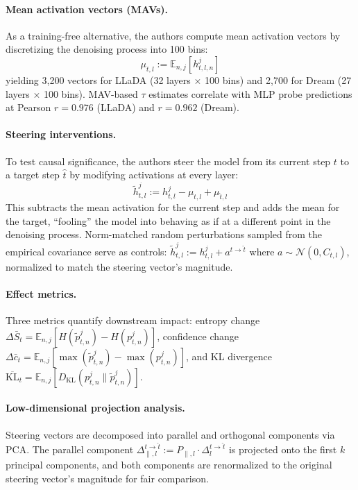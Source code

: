 \documentclass[11pt,a4paper]{article}
\begin{document}
\paragraph{Mean activation vectors (MAVs).}
As a training-free alternative, the authors compute mean activation vectors by discretizing the denoising process into 100 bins:
\begin{equation}
    \mu_{t,l} := \mathbb{E}_{n,j}[h_{t,l,n}^j]
\end{equation}
yielding 3,200 vectors for LLaDA (32 layers $\times$ 100 bins) and 2,700 for Dream (27 layers $\times$ 100 bins). MAV-based $\tau$ estimates correlate with MLP probe predictions at Pearson $r = 0.976$ (LLaDA) and $r = 0.962$ (Dream).

\paragraph{Steering interventions.}
To test causal significance, the authors steer the model from its current step $t$ to a target step $\hat{t}$ by modifying activations at every layer:
\begin{equation}
    \tilde{h}_{t,l}^j := h_{t,l}^j - \mu_{t,l} + \mu_{\hat{t},l}
\end{equation}
This subtracts the mean activation for the current step and adds the mean for the target, ``fooling'' the model into behaving as if at a different point in the denoising process. Norm-matched random perturbations sampled from the empirical covariance serve as controls: $\tilde{h}_{t,l}^j := h_{t,l}^j + a^{t \to \hat{t}}$ where $a \sim \mathcal{N}(0, C_{t,l})$, normalized to match the steering vector's magnitude.

\paragraph{Effect metrics.}
Three metrics quantify downstream impact: entropy change $\Delta\bar{S}_t = \mathbb{E}_{n,j}[H(\tilde{p}_{t,n}^j) - H(p_{t,n}^j)]$, confidence change $\Delta\bar{c}_t = \mathbb{E}_{n,j}[\max(\tilde{p}_{t,n}^j) - \max(p_{t,n}^j)]$, and KL divergence $\overline{\text{KL}}_t = \mathbb{E}_{n,j}[D_{\text{KL}}(p_{t,n}^j \| \tilde{p}_{t,n}^j)]$.

\paragraph{Low-dimensional projection analysis.}
Steering vectors are decomposed into parallel and orthogonal components via PCA. The parallel component $\Delta_{\parallel,l}^{t \to \hat{t}} := P_{\parallel,l} \cdot \Delta_l^{t \to \hat{t}}$ is projected onto the first $k$ principal components, and both components are renormalized to the original steering vector's magnitude for fair comparison.
\end{document}
